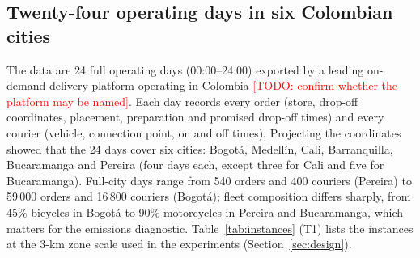 \documentclass[preprint,12pt,authoryear]{elsarticle}%
\newcommand{\todo}[1]{\textcolor{red}{[TODO: #1]}}
\begin{document}
\subsection{Twenty-four operating days in six Colombian cities}

The data are 24 full operating days (00:00--24:00) exported by a leading on-demand delivery platform operating in Colombia \todo{confirm whether the platform may be named}. Each day records every order (store, drop-off coordinates, placement, preparation and promised drop-off times) and every courier (vehicle, connection point, on and off times). Projecting the coordinates showed that the 24 days cover six cities: Bogot\'a, Medell\'in, Cali, Barranquilla, Bucaramanga and Pereira (four days each, except three for Cali and five for Bucaramanga). Full-city days range from 540 orders and 400 couriers (Pereira) to 59\,000 orders and 16\,800 couriers (Bogot\'a); fleet composition differs sharply, from 45\% bicycles in Bogot\'a to 90\% motorcycles in Pereira and Bucaramanga, which matters for the emissions diagnostic. Table~\ref{tab:instances} (T1) lists the instances at the 3-km zone scale used in the experiments (Section~\ref{sec:design}).
\end{document}
